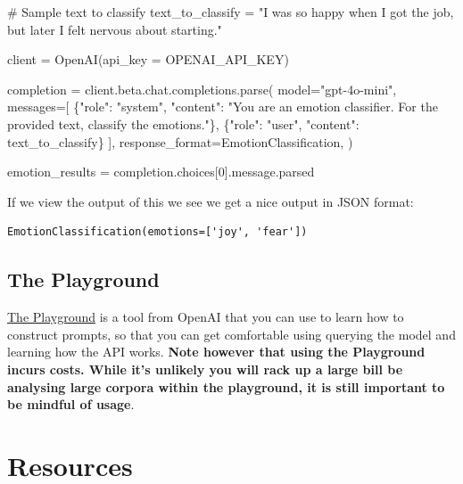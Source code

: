 \documentclass[
  letterpaper,
  DIV=11,
  numbers=noendperiod]{scrreprt}
\newenvironment{Shaded}{\begin{snugshade}}{\end{snugshade}}
\newcommand{\CommentTok}[1]{\textcolor[rgb]{0.37,0.37,0.37}{#1}}
\newcommand{\DecValTok}[1]{\textcolor[rgb]{0.68,0.00,0.00}{#1}}
\newcommand{\NormalTok}[1]{\textcolor[rgb]{0.00,0.23,0.31}{#1}}
\newcommand{\OperatorTok}[1]{\textcolor[rgb]{0.37,0.37,0.37}{#1}}
\newcommand{\StringTok}[1]{\textcolor[rgb]{0.13,0.47,0.30}{#1}}
\begin{document}
\begin{Shaded}
\begin{Highlighting}[]
\CommentTok{\# Sample text to classify}
\NormalTok{text\_to\_classify }\OperatorTok{=} \StringTok{"I was so happy when I got the job, but later I felt nervous about starting."}

\NormalTok{client }\OperatorTok{=}\NormalTok{ OpenAI(api\_key }\OperatorTok{=}\NormalTok{ OPENAI\_API\_KEY)}

\NormalTok{completion }\OperatorTok{=}\NormalTok{ client.beta.chat.completions.parse(}
\NormalTok{    model}\OperatorTok{=}\StringTok{"gpt{-}4o{-}mini"}\NormalTok{,}
\NormalTok{    messages}\OperatorTok{=}\NormalTok{[}
\NormalTok{        \{}\StringTok{"role"}\NormalTok{: }\StringTok{"system"}\NormalTok{, }\StringTok{"content"}\NormalTok{: }\StringTok{"You are an emotion classifier. For the provided text, classify the emotions."}\NormalTok{\},}
\NormalTok{        \{}\StringTok{"role"}\NormalTok{: }\StringTok{"user"}\NormalTok{, }\StringTok{"content"}\NormalTok{: text\_to\_classify\}}
\NormalTok{    ],}
\NormalTok{    response\_format}\OperatorTok{=}\NormalTok{EmotionClassification,}
\NormalTok{)}

\NormalTok{emotion\_results }\OperatorTok{=}\NormalTok{ completion.choices[}\DecValTok{0}\NormalTok{].message.parsed}
\end{Highlighting}
\end{Shaded}

If we view the output of this we see we get a nice output in JSON
format:

\begin{verbatim}
EmotionClassification(emotions=['joy', 'fear'])
\end{verbatim}

\section{The Playground}\label{the-playground}

\href{https://platform.openai.com/playground/chat?models=gpt-4o-mini}{The
Playground} is a tool from OpenAI that you can use to learn how to
construct prompts, so that you can get comfortable using querying the
model and learning how the API works. \textbf{Note however that using
the Playground incurs costs. While it's unlikely you will rack up a
large bill be analysing large corpora within the playground, it is still
important to be mindful of usage}.

\chapter{Resources}\label{resources}
\end{document}
